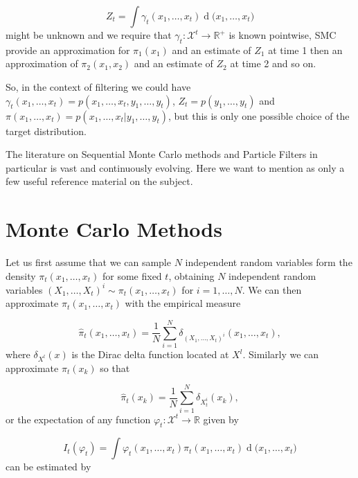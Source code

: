\documentclass[11pt,a4paper]{article}
\renewcommand{\d}[1]{\ensuremath{\operatorname{d}\!{#1}}}
\begin{document}
\begin{equation*}
    Z_t = \int \gamma_t(x_1, \dots, x_t) \d (x_1, \dots, x_t)
\end{equation*}
might be unknown and we require that $\gamma_t : \mathcal{X}^t \rightarrow \mathbb{R}^+$ is known pointwise, SMC provide an approximation for $\pi_1(x_1)$ and an estimate of $Z_1$ at time 1 then an approximation of $\pi_2(x_1, x_2)$ and an estimate of $Z_2$ at time 2 and so on.

So, in the context of filtering we could have $\gamma_t(x_1, \dots, x_t) = p(x_1, \dots, x_t, y_1, \dots, y_t)$, $Z_t = p(y_1, \dots, y_t)$ and $\pi(x_1, \dots, x_t) = p(x_1, \dots, x_t | y_1, \dots, y_t)$, but this is only one possible choice of the target distribution.

The literature on Sequential Monte Carlo methods and Particle Filters in particular is vast and continuously evolving. Here we want to mention \cite{} as only a few useful reference material on the subject.

\section{Monte Carlo Methods}

Let us first assume that we can sample $N$ independent random variables form the density $\pi_t(x_1, \dots, x_t)$ for some fixed $t$, obtaining $N$ independent random variables $(X_1, \dots, X_t)^i \sim \pi_t(x_1, \dots, x_t)$ for $i = 1, \dots, N$. We can then approximate $\pi_t(x_1, \dots, x_t)$ with the empirical measure

\begin{equation*}
    \hat{\pi}_t(x_1, \dots, x_t) = \frac{1}{N} \sum_{i=1}^N \delta_{(X_1, \dots, X_t)^i}(x_1, \dots, x_t),
\end{equation*}
where $\delta_{X^l}(x)$ is the Dirac delta function located at $X^l$. Similarly we can approximate $\pi_t(x_k)$ so that

\begin{equation*}
    \hat{\pi}_t(x_k) = \frac{1}{N} \sum_{i=1}^N \delta_{X_t^i}(x_k),
\end{equation*}
or the expectation of any function $\varphi_t : \mathcal{X}^t \rightarrow \mathbb{R}$ given by

\begin{equation*}
    I_t(\varphi_t) = \int \varphi_t (x_1, \dots, x_t) \pi_t (x_1, \dots, x_t) \d (x_1, \dots, x_t)
\end{equation*}
can be estimated by
\end{document}
